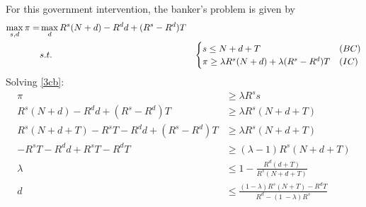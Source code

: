 \documentclass[12pt]{article}
\begin{document}
\begin{enumerate}
\begin{enumerate}
    For this government intervention, the banker's problem is given by 
    \begin{align}
            \max_{s,d}\pi =&\max_{d}  R^s(N+d) - R^dd+ (R^s-R^d)T   \label{3cb}
            \\ & s.t. &\begin{cases}
                s \leq N + d + T & (BC)
                \\ \pi \geq \lambda R^s(N+d) + \lambda (R^s - R^d)T & (IC)
            \end{cases}\notag 
    \end{align}
    Solving \eqref{3cb}:
    \begin{align*}
        \pi &\geq \lambda R^ss 
        \\ R^s(N+d) - R^dd+ (R^s-R^d)T   &\geq \lambda R^s(N+d+T)
        \\ R^s(N+d+T) - R^sT- R^dd+ (R^s-R^d)T  &\geq \lambda R^s(N+d+T)
        \\  - R^sT- R^dd+ R^sT - R^dT &\geq (\lambda-1) R^s(N+d+T)
        \\ \lambda &\leq 1- \frac{R^d(d+T)}{ R^s(N+d+T)} 
        \\ d &\leq \frac{\left(1-\lambda\right)R^{s}\left(N+T\right)-R^{d}T}{R^{d}-\left(1\ -\lambda\right)R^{s}}

\end{align*}
\end{enumerate}
\end{enumerate}
\end{document}
